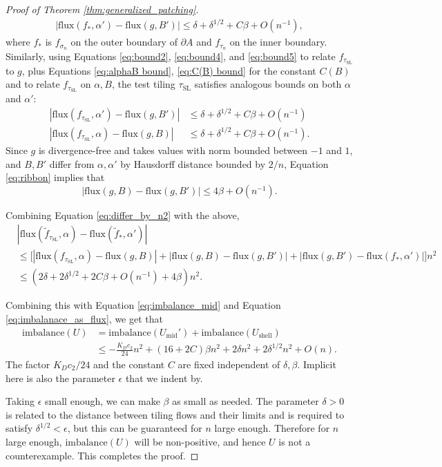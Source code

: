 \documentclass[10pt,a4paper]{amsart}
\begin{document}
\begin{proof}[Proof of Theorem \ref{thm:generalized_patching}]
 \begin{align}
    |\text{flux}(f_{*},\alpha') - \text{flux}(g,B')| \leq \delta + \delta^{1/2} + C\beta + O(n^{-1}),
\end{align}
where $f_{*}$ is $f_{\sigma_n}$ on the outer boundary of $\partial A$ and $f_{\tau_n}$ on the inner boundary. Similarly, using Equations \eqref{eq:bound2}, \eqref{eq:bound4}, and \eqref{eq:bound5} to relate $f_{\tau_\text{SL}}$ to $g$, plus Equations \eqref{eq:alphaB bound}, \eqref{eq:C(B) bound} for the constant $C(B)$ and to relate $f_{\tau_\text{SL}}$ on $\alpha, B$, the test tiling $\tau_{\text{SL}}$ satisfies analogous bounds on both $\alpha$ and $\alpha'$:
\begin{align}
    |\text{flux}(f_{\tau_{\text{SL}}},\alpha') - \text{flux}(g,B')| &\leq \delta +\delta^{1/2}+ C\beta + O(n^{-1})\\
     |\text{flux}(f_{\tau_{\text{SL}}},\alpha) - \text{flux}(g,B)| &\leq \delta +\delta^{1/2} + C\beta + O(n^{-1}).
\end{align}
Since $g$ is divergence-free and takes values with norm bounded between $-1$ and $1$, and $B,B'$ differ from $\alpha,\alpha'$ by Hausdorff distance bounded by $2/n$, Equation \eqref{eq:ribbon} implies that
    \begin{equation}\label{eq:bound6}
        |\text{flux}(g,B) - \text{flux}(g,B')| \leq 4\beta + O(n^{-1}).
    \end{equation}

Combining Equation \eqref{eq:differ_by_n2} with the above, 
    \begin{align}
        &|\text{flux}(\widetilde f_{\tau_{\text{SL}}},\alpha) - \text{flux}(\widetilde f_{\ast},\alpha')| \\
        &\leq \bigg[|\text{flux}(f_{\tau_{\text{SL}}},\alpha)-\text{flux}(g,B)| +|\text{flux}(g,B)-\text{flux}(g,B')| +|\text{flux}(g,B')-\text{flux}(f_{*},\alpha')|\bigg] n^2 \\
        &\leq (2 \delta + 2\delta^{1/2} + 2 C \beta + O(n^{-1}) + 4\beta )n^2.
    \end{align}

    Combining this with Equation \eqref{eq:imbalance_mid} and Equation \eqref{eq:imbalanace_as_flux}, we get that
    \begin{align*}
        \text{imbalance}(U) &= \text{imbalance}(U_{\text{mid}}') + \text{imbalance}(U_{\text{shell}}) \\
        &\leq -\frac{K_D c_2}{24}n^2 + (16+2C)\beta n^2 + 2\delta n^2 + 2\delta^{1/2} n^2 + O(n).
    \end{align*}
    The factor $K_D c_2/24$ and the constant $C$ are fixed independent of $\delta,\beta$. Implicit here is also the parameter $\epsilon$ that we indent by.
    
    Taking $\epsilon$ small enough, we can make $\beta$ as small as needed. The parameter $\delta>0$ is related to the distance between tiling flows and their limits and is required to satisfy $\delta^{1/2}<\epsilon$, but this can be guaranteed for $n$ large enough. Therefore for $n$ large enough, $\text{imbalance}(U)$ will be non-positive, and hence $U$ is not a counterexample. This completes the proof.
\end{proof}
\end{document}
